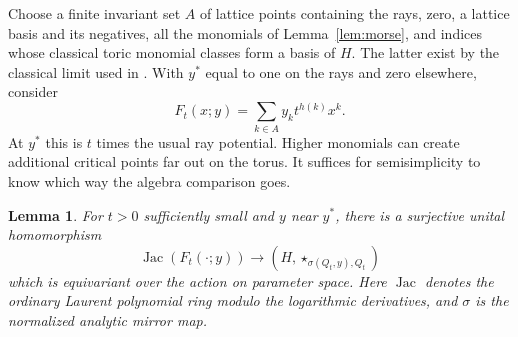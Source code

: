 \documentclass[11pt]{amsart}
\newtheorem{lemma}[theorem]{Lemma}
\theoremstyle{definition}
\DeclareMathOperator{\Jac}{Jac}
\begin{document}
Choose a finite invariant set $A$ of lattice points containing the rays, zero, a lattice basis and its negatives, all the monomials of Lemma~\ref{lem:morse}, and indices whose classical toric monomial classes form a basis of $H$. The latter exist by the classical limit used in \cite[proof of Corollary~7.3]{CCIT}. With $y^*$ equal to one on the rays and zero elsewhere, consider
\[
             F_t(x;y)=\sum_{k\in A} y_k t^{h(k)}x^k.
\]
At $y^*$ this is $t$ times the usual ray potential. Higher monomials can create additional critical points far out on the torus. It suffices for semisimplicity to know which way the algebra comparison goes.

\begin{lemma}\label{lem:quot}
For $t>0$ sufficiently small and $y$ near $y^*$, there is a surjective unital homomorphism
\[
 \Jac(F_t(\cdot;y))\longrightarrow (H,\star_{\sigma(Q_t,y),Q_t})
\]
which is equivariant over the action on parameter space. Here $\Jac$ denotes the ordinary Laurent polynomial ring modulo the logarithmic derivatives, and $\sigma$ is the normalized analytic mirror map.
\end{lemma}
\end{document}
